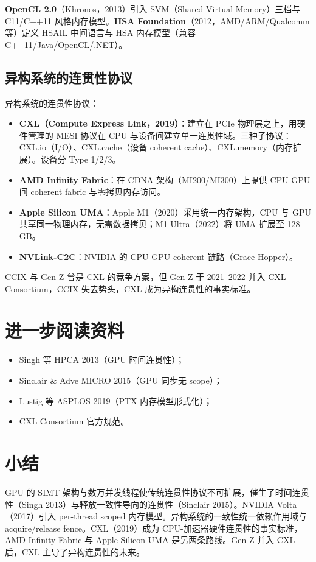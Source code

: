\textbf{OpenCL 2.0}（Khronos，2013）引入 SVM（Shared Virtual Memory）三档与 C11/C++11 风格内存模型。\textbf{HSA Foundation}（2012，AMD/ARM/Qualcomm 等）定义 HSAIL 中间语言与 HSA 内存模型（兼容 C++11/Java/OpenCL/.NET）。

\subsection{异构系统的连贯性协议}

异构系统的连贯性协议：

\begin{itemize}
\item \textbf{CXL（Compute Express Link，2019）}：建立在 PCIe 物理层之上，用硬件管理的 MESI 协议在 CPU 与设备间建立单一连贯性域。三种子协议：CXL.io（I/O）、CXL.cache（设备 coherent cache）、CXL.memory（内存扩展）。设备分 Type 1/2/3。
\item \textbf{AMD Infinity Fabric}：在 CDNA 架构（MI200/MI300）上提供 CPU-GPU 间 coherent fabric 与零拷贝内存访问。
\item \textbf{Apple Silicon UMA}：Apple M1（2020）采用统一内存架构，CPU 与 GPU 共享同一物理内存，无需数据拷贝；M1 Ultra（2022）将 UMA 扩展至 128 GB。
\item \textbf{NVLink-C2C}：NVIDIA 的 CPU-GPU coherent 链路（Grace Hopper）。
\end{itemize}


CCIX 与 Gen-Z 曾是 CXL 的竞争方案，但 Gen-Z 于 2021–2022 并入 CXL Consortium，CCIX 失去势头，CXL 成为异构连贯性的事实标准。

\section{进一步阅读资料}

\begin{itemize}
\item Singh 等 HPCA 2013（GPU 时间连贯性）；
\item Sinclair \& Adve MICRO 2015（GPU 同步无 scope）；
\item Lustig 等 ASPLOS 2019（PTX 内存模型形式化）；
\item CXL Consortium 官方规范。
\end{itemize}


\section{小结}

GPU 的 SIMT 架构与数万并发线程使传统连贯性协议不可扩展，催生了时间连贯性（Singh 2013）与释放一致性导向的连贯性（Sinclair 2015）。NVIDIA Volta（2017）引入 per-thread scoped 内存模型。异构系统的一致性统一依赖作用域与 acquire/release fence。CXL（2019）成为 CPU-加速器硬件连贯性的事实标准，AMD Infinity Fabric 与 Apple Silicon UMA 是另两条路线。Gen-Z 并入 CXL 后，CXL 主导了异构连贯性的未来。


